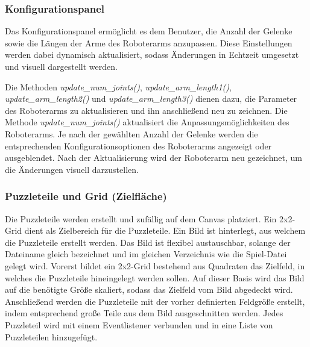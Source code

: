 \documentclass[12pt]{article}
\begin{document}
    \subsubsection{Konfigurationspanel}
    Das Konfigurationspanel ermöglicht es dem Benutzer, die Anzahl der Gelenke sowie die Längen der Arme
    des Roboterarms anzupassen. Diese Einstellungen werden dabei dynamisch aktualisiert, sodass Änderungen
    in Echtzeit umgesetzt und visuell dargestellt werden.

    

    Die Methoden \textit{update\_num\_joints()}, \textit{update\_arm\_length1()},
    \textit{update\_arm\_length2()} und
    \textit{update\_arm\_length3()} dienen dazu, die Parameter des Roboterarms zu aktualisieren und ihn
    anschließend neu zu zeichnen.
    Die Methode \textit{update\_num\_joints()} aktualisiert die Anpassungsmöglichkeiten des Roboterarms. Je nach
    der gewählten Anzahl der Gelenke werden die entsprechenden Konfigurationsoptionen des Roboterarms
    angezeigt oder ausgeblendet. Nach der Aktualisierung wird der Roboterarm neu gezeichnet, um die
    Änderungen visuell darzustellen.

    

    \subsubsection{Puzzleteile und Grid (Zielfläche)}
    Die Puzzleteile werden erstellt und zufällig auf dem Canvas platziert. Ein 2x2-Grid dient als
    Zielbereich für die Puzzleteile. Ein Bild ist hinterlegt, aus welchem die Puzzleteile erstellt werden.
    Das Bild ist flexibel austauschbar, solange der Dateiname gleich bezeichnet und im gleichen Verzeichnis wie die
    Spiel-Datei gelegt wird. Vorerst bildet ein 2x2-Grid bestehend aus Quadraten das Zielfeld, in welches die Puzzleteile
    hineingelegt werden sollen. Auf dieser Basis wird das Bild auf die benötigte Größe skaliert, sodass
    das Zielfeld vom Bild abgedeckt wird. Anschließend werden die Puzzleteile mit der vorher definierten
    Feldgröße erstellt, indem entsprechend große Teile aus dem Bild ausgeschnitten werden. Jedes
    Puzzleteil wird mit einem Eventlistener verbunden und in eine Liste von Puzzleteilen hinzugefügt.
\end{document}
